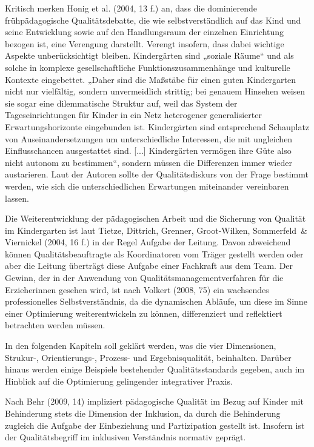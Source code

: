 Kritisch merken Honig et al. (2004, 13 f.) an, dass die dominierende frühpädagogische Qualitätsdebatte, die wie selbstverständlich auf das Kind und seine Entwicklung sowie auf den Handlungsraum der einzelnen Einrichtung bezogen ist, eine Verengung darstellt. Verengt insofern, dass dabei wichtige Aspekte unberücksichtigt bleiben. Kindergärten sind „soziale Räume“ und als solche in komplexe gesellschaftliche Funktionszusammenhänge und kulturelle Kontexte eingebettet. „Daher sind die Maßstäbe für einen guten Kindergarten nicht nur vielfältig, sondern unvermeidlich strittig; bei genauem Hinsehen weisen sie sogar eine dilemmatische Struktur auf, weil das System der Tageseinrichtungen für Kinder in ein Netz heterogener generalisierter Erwartungshorizonte eingebunden ist. Kindergärten sind entsprechend Schauplatz von Auseinandersetzungen um unterschiedliche Interessen, die mit ungleichen Einflusschancen ausgestattet sind. [...] Kindergärten vermögen ihre Güte also nicht autonom zu bestimmen“, sondern müssen die Differenzen immer wieder austarieren. 
Laut der Autoren sollte der Qualitätsdiskurs von der Frage bestimmt werden, wie sich die unterschiedlichen Erwartungen miteinander vereinbaren lassen.

Die Weiterentwicklung der pädagogischen Arbeit und die Sicherung von Qualität im Kindergarten ist laut Tietze, Dittrich, Grenner, Groot-Wilken, Sommerfeld~\& Viernickel (2004, 16 f.) in der Regel Aufgabe der Leitung. Davon abweichend können Qualitätsbeauftragte als Koordinatoren vom Träger gestellt werden oder aber die Leitung überträgt diese Aufgabe einer Fachkraft aus dem Team. 
Der Gewinn, der in der Anwendung von Qualitätsmanagementverfahren für die Erzieherinnen gesehen wird, ist nach Volkert (2008, 75) ein  wachsendes professionelles Selbstverständnis, da die dynamischen Abläufe, um diese im Sinne einer Optimierung weiterentwickeln zu können, differenziert und reflektiert betrachten werden müssen.

In den folgenden Kapiteln soll geklärt werden, was die vier Dimensionen, Strukur-, Orientierungs-, Prozess- und Ergebnisqualität, beinhalten. Darüber hinaus werden einige Beispiele bestehender Qualitätsstandards gegeben, auch im Hinblick auf die Optimierung gelingender integrativer Praxis. 

Nach Behr (2009, 14) impliziert pädagogische Qualität im Bezug auf Kinder mit Behinderung stets die Dimension der Inklusion, da durch die Behinderung zugleich die Aufgabe der Einbeziehung und Partizipation gestellt ist. Insofern ist der Qualitätsbegriff im inklusiven Verständnis normativ geprägt. 

